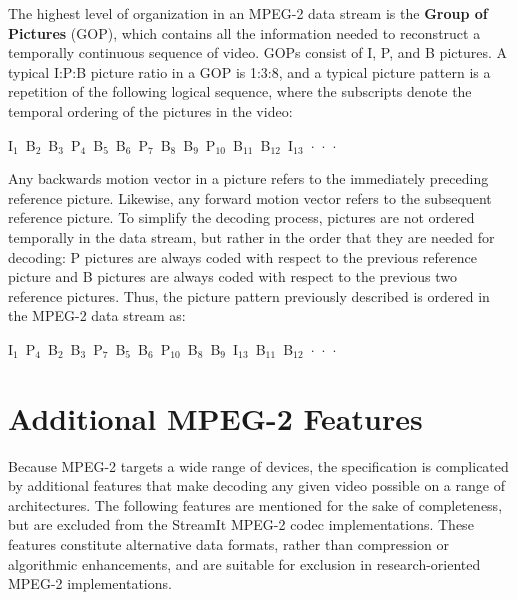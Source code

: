 The highest level of organization in an MPEG-2 data stream
is the \textbf{Group of Pictures} (GOP), which 
contains all the information needed to reconstruct a temporally continuous sequence of
video. GOPs consist of I, P, and B pictures.
A typical I:P:B picture ratio in a GOP is 1:3:8, and a typical
picture pattern is a repetition of the following logical sequence,
where the subscripts denote the temporal ordering of the pictures in the video:
\begin{center}
I$_1$~B$_2$~B$_3$~P$_4$~B$_5$~B$_6$~P$_7$~B$_8$~B$_9$~P$_{10}$~B$_{11}$~B$_{12}$~I$_{13}$~$\cdot$~$\cdot$~$\cdot$
\end{center}

Any backwards motion vector in a picture refers to the immediately preceding
reference picture. Likewise, any forward motion vector refers to the subsequent
reference picture. To simplify the decoding process, pictures are not ordered
temporally in the data stream, but rather in the order that they are needed for decoding:
P pictures are always coded with respect to the previous
reference picture and B pictures are always coded with respect to the previous two
reference pictures. Thus, the picture pattern previously described is ordered
in the MPEG-2 data stream as:
\begin{center}
I$_1$~P$_4$~B$_2$~B$_3$~P$_7$~B$_5$~B$_6$~P$_{10}$~B$_8$~B$_9$~I$_{13}$~B$_{11}$~B$_{12}$~$\cdot$~$\cdot$~$\cdot$
\end{center}

\section{Additional MPEG-2 Features}
\label{additional:mpeg}
Because MPEG-2 targets a wide range of devices, the specification is complicated by additional features that make decoding any given video possible on a range of architectures. The following features are mentioned for the sake of completeness, but are excluded from the StreamIt MPEG-2 codec implementations. These features constitute alternative data formats, rather than compression or algorithmic enhancements, and are suitable for exclusion in research-oriented MPEG-2 implementations.

